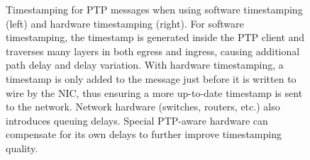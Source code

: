 \begin{figure}
    \caption{
        Timestamping for PTP messages when using software timestamping (left) and hardware timestamping (right). For software timestamping, the timestamp is generated inside the PTP client and traverses many layers in both egress and ingress, causing additional path delay and delay variation. With hardware timestamping, a timestamp is only added to the message just before it is written to wire by the NIC, thus ensuring a more up-to-date timestamp is sent to the network.
        Network hardware (switches, routers, etc.) also introduces queuing delays. Special PTP-aware hardware can compensate for its own delays to further improve timestamping quality.
    }
    \label{fig:ptp-sw-hw}
\end{figure}
